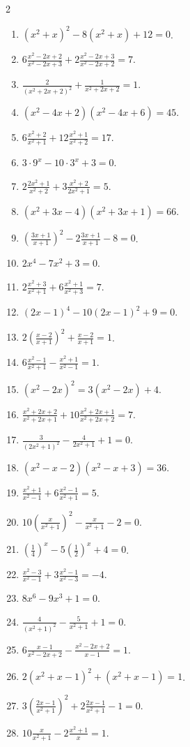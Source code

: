 \documentclass[11pt,a4paper]{article}
\begin{document}
\begin{multicols}{2}
\begin{enumerate}
\item \(\displaystyle \left(x^2+x\right)^2-8\left(x^2+x\right)+12=0\).
\item \(\displaystyle 6\frac{x^2-2x+2}{x^2-2x+3}+2\frac{x^2-2x+3}{x^2-2x+2}=7\).
\item \(\displaystyle \frac{2}{(x^2+2x+2)^2}+\frac1{x^2+2x+2}=1\).
\item \(\displaystyle \left(x^2-4x+2\right)\left(x^2-4x+6\right)=45\).
\item \(\displaystyle 6\frac{x^2+2}{x^2+1}+12\frac{x^2+1}{x^2+2}=17\).
\item \(\displaystyle 3\cdot 9^x-10\cdot 3^x+3=0\).
\item \(\displaystyle 2\frac{2x^2+1}{x^2+2}+3\frac{x^2+2}{2x^2+1}=5\).
\item \(\displaystyle \left(x^2+3x-4\right)\left(x^2+3x+1\right)=66\).
\item \(\displaystyle \left(\frac{3x+1}{x+1}\right)^2-2\frac{3x+1}{x+1}-8=0\).
\item \(\displaystyle 2x^4-7x^2+3=0\).
\item \(\displaystyle 2\frac{x^2+3}{x^2+1}+6\frac{x^2+1}{x^2+3}=7\).
\item \(\displaystyle \left(2x-1\right)^4-10\left(2x-1\right)^2+9=0\).
\item \(\displaystyle 2\left(\frac{x-2}{x+1}\right)^2+\frac{x-2}{x+1}=1\).
\item \(\displaystyle 6\frac{x^2-1}{x^2+1}-\frac{x^2+1}{x^2-1}=1\).
\item \(\displaystyle \left(x^2-2x\right)^2=3\left(x^2-2x\right)+4\).
\item \(\displaystyle \frac{x^2+2x+2}{x^2+2x+1}+10\frac{x^2+2x+1}{x^2+2x+2}=7\).
\item \(\displaystyle \frac{3}{(2x^2+1)^2}-\frac{4}{2x^2+1}+1=0\).
\item \(\displaystyle \left(x^2-x-2\right)\left(x^2-x+3\right)=36\).
\item \(\displaystyle \frac{x^2+1}{x^2-1}+6\frac{x^2-1}{x^2+1}=5\).
\item \(\displaystyle 10\left(\frac{x}{x^2+1}\right)^2-\frac{x}{x^2+1}-2=0\).
\item \(\displaystyle \left(\frac14\right)^x-5\left(\frac12\right)^x+4=0\).
\item \(\displaystyle \frac{x^2-3}{x^2-1}+3\frac{x^2-1}{x^2-3}=-4\).
\item \(\displaystyle 8x^6-9x^3+1=0\).
\item \(\displaystyle \frac{4}{(x^2+1)^2}-\frac{5}{x^2+1}+1=0\).
\item \(\displaystyle 6\frac{x-1}{x^2-2x+2}-\frac{x^2-2x+2}{x-1}=1\).
\item \(\displaystyle 2\left(x^2+x-1\right)^2+\left(x^2+x-1\right)=1\).
\item \(\displaystyle 3\left(\frac{2x-1}{x^2+1}\right)^2+2\frac{2x-1}{x^2+1}-1=0\).
\item \(\displaystyle 10\frac{x}{x^2+1}-2\frac{x^2+1}{x}=1\).
\end{enumerate}
\end{multicols}
\clearpage
\end{document}
